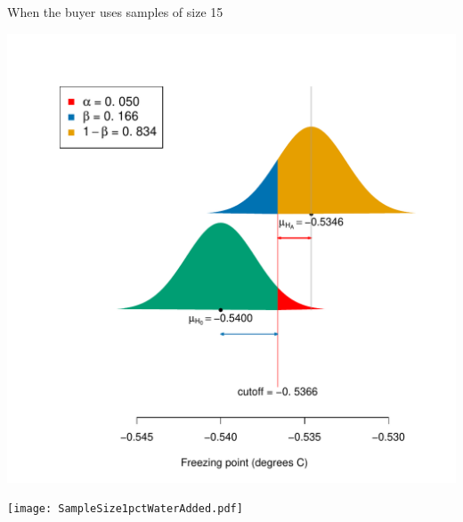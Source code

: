 \documentclass[10pt]{beamer}\usepackage[]{graphicx}\usepackage[]{color}
\makeatletter
\def\maxwidth{ %
  \ifdim\Gin@nat@width>\linewidth
    \linewidth
  \else
    \Gin@nat@width
  \fi
}
\newenvironment{knitrout}{}{} %
\makeatother
\begin{document}
\begin{frame}[fragile]{When the buyer uses samples of size 15}
\begin{knitrout}\tiny
{}\color{fgcolor}

{\centering \includegraphics[width=\maxwidth]{figure/unnamed-chunk-14-1} 

}


\end{knitrout}
\end{frame}


\begin{frame}
	\begin{center}
		\texttt{[image: SampleSize1pctWaterAdded.pdf]} 
	\end{center}
\end{frame}
\end{document}
